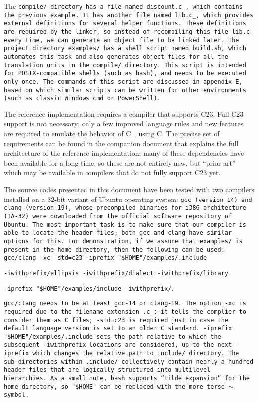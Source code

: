 The \tt{compile/} directory has a file named \tt{discount.c_},
which contains the previous example.
It has another file named \tt{lib.c_},
which provides external definitions for several helper functions.
These definitions are required by the linker, so instead of recompiling this
file \tt{lib.c_} every time, we can generate an object file to be linked later.
The project directory \tt{examples/} has a shell script named \tt{build.sh},
which automates this task and also generates object files
for all the translation units in the \tt{compile/} directory.
This script is intended for POSIX-compatible shells (such as \tt{bash}),
and needs to be executed only once.
The commands of this script are discussed in appendix E,
based on which similar scripts can be written for other environments
(such as classic Windows \tt{cmd} or \tt{PowerShell}).

The reference implementation requires a compiler that supports C23.
Full C23 support is not necessary; only a few improved language rules
and new features are required to emulate the behavior of C\_ using C.
The precise set of requirements can be found in the companion document
that explains the full architecture of the reference implementation;
many of these dependencies have been available for a long time,
so these are not entirely new, but ``prior art'' which may
be available in compilers that do not fully support C23 yet.

The source codes presented in this document have been tested with two
compilers installed on a 32-bit variant of Ubuntu operating system:
\tt{gcc} (version 14) and \tt{clang} (version 19),
whose precompiled binaries for i386 architecture (IA-32)
were downloaded from the official software repository of Ubuntu.
The most important task is to make sure that our compiler is able to locate the
header files; both \tt{gcc} and \tt{clang} have similar options for this.
For demonstration, if we assume that \tt{examples/} is present
in the home directory, then the following can be used:\\

\tt{gcc/clang -xc -std=c23 -iprefix "\$HOME"/examples/.include}

\tt{-iwithprefix/ellipsis -iwithprefix/dialect -iwithprefix/library}

\tt{-iprefix "\$HOME"/examples/include -iwithprefix/.}

\tt{gcc/clang} needs to be at least \tt{gcc-14} or \tt{clang-19}.
The option \tt{-xc} is required due to the filename extension \tt{.c_}:
it tells the complier to consider them as C files;
\tt{-std=c23} is required just in case the default
language version is set to an older C standard.
\tt{-iprefix "\$HOME"/examples/.include} sets the path relative to which
the subsequent \tt{-iwithprefix} locations are considered, up to the next
\tt{-iprefix} which changes the relative path to \tt{include/} directory.
The sub-directories within \tt{.include/} collectively contain nearly a hundred
header files that are logically structured into multilevel hierarchies.
As a small note, \tt{bash} supports ``tilde expansion'' for the home
directory, so \tt{"\$HOME"} can be replaced with the more terse $\sim$ symbol.

